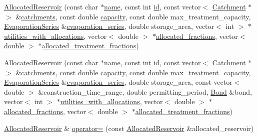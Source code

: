 \begin{DoxyCompactItemize}
\item 
\mbox{\hyperlink{classAllocatedReservoir_a17a60d40d936b1a68459d0bd9578aada}{Allocated\+Reservoir}} (const char $\ast$\mbox{\hyperlink{classWaterSource_a846ea74c5b453d014f594d41fee8c765}{name}}, const int \mbox{\hyperlink{classWaterSource_a6eafe5dfefd317877d1244e8a7c6e742}{id}}, const vector$<$ \mbox{\hyperlink{classCatchment}{Catchment}} $\ast$$>$ \&\mbox{\hyperlink{classWaterSource_a8c18c34f23f8a06685c1d12f462ed830}{catchments}}, const double \mbox{\hyperlink{classWaterSource_a2ec257b415b248214a8bce7fc5267723}{capacity}}, const double max\+\_\+treatment\+\_\+capacity, \mbox{\hyperlink{classEvaporationSeries}{Evaporation\+Series}} \&\mbox{\hyperlink{classReservoir_a2d2d9b302c13703309bb798d24136810}{evaporation\+\_\+series}}, double storage\+\_\+area, vector$<$ int $>$ $\ast$\mbox{\hyperlink{classWaterSource_ac345583fc2d0f7e1db31ee40244d7ace}{utilities\+\_\+with\+\_\+allocations}}, vector$<$ double $>$ $\ast$\mbox{\hyperlink{classWaterSource_a2f6655a80c4847fe039987255d9d998c}{allocated\+\_\+fractions}}, vector$<$ double $>$ $\ast$\mbox{\hyperlink{classWaterSource_aa73fe10cfc6579b2fb79529e1dde5140}{allocated\+\_\+treatment\+\_\+fractions}})
\item 
\mbox{\hyperlink{classAllocatedReservoir_a44ac982717a21a0b24bb3019d07ffe89}{Allocated\+Reservoir}} (const char $\ast$\mbox{\hyperlink{classWaterSource_a846ea74c5b453d014f594d41fee8c765}{name}}, const int \mbox{\hyperlink{classWaterSource_a6eafe5dfefd317877d1244e8a7c6e742}{id}}, const vector$<$ \mbox{\hyperlink{classCatchment}{Catchment}} $\ast$$>$ \&\mbox{\hyperlink{classWaterSource_a8c18c34f23f8a06685c1d12f462ed830}{catchments}}, const double \mbox{\hyperlink{classWaterSource_a2ec257b415b248214a8bce7fc5267723}{capacity}}, const double max\+\_\+treatment\+\_\+capacity, \mbox{\hyperlink{classEvaporationSeries}{Evaporation\+Series}} \&\mbox{\hyperlink{classReservoir_a2d2d9b302c13703309bb798d24136810}{evaporation\+\_\+series}}, double storage\+\_\+area, const vector$<$ double $>$ \&construction\+\_\+time\+\_\+range, double permitting\+\_\+period, \mbox{\hyperlink{classBond}{Bond}} \&bond, vector$<$ int $>$ $\ast$\mbox{\hyperlink{classWaterSource_ac345583fc2d0f7e1db31ee40244d7ace}{utilities\+\_\+with\+\_\+allocations}}, vector$<$ double $>$ $\ast$\mbox{\hyperlink{classWaterSource_a2f6655a80c4847fe039987255d9d998c}{allocated\+\_\+fractions}}, vector$<$ double $>$ $\ast$\mbox{\hyperlink{classWaterSource_aa73fe10cfc6579b2fb79529e1dde5140}{allocated\+\_\+treatment\+\_\+fractions}})
\item 
\mbox{\hyperlink{classAllocatedReservoir}{Allocated\+Reservoir}} \& \mbox{\hyperlink{classAllocatedReservoir_a83551e53169014906ce7380005efb4f8}{operator=}} (const \mbox{\hyperlink{classAllocatedReservoir}{Allocated\+Reservoir}} \&allocated\+\_\+reservoir)

\end{DoxyCompactItemize}
